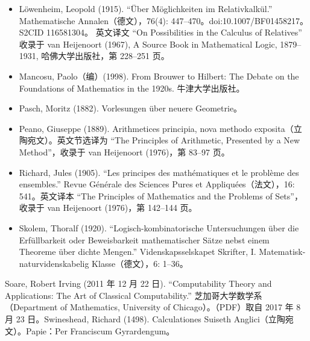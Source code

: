 \begin{itemize}
  \item Löwenheim, Leopold (1915). “Über Möglichkeiten im Relativkalkül.” Mathematische Annalen（德文），76(4): 447–470。doi:10.1007/BF01458217。S2CID 116581304。  
        英文译文 “On Possibilities in the Calculus of Relatives” 收录于 van Heijenoort (1967), A Source Book in Mathematical Logic, 1879–1931, 哈佛大学出版社，第 228–251 页。
  \item Mancosu, Paolo（编）(1998). From Brouwer to Hilbert: The Debate on the Foundations of Mathematics in the 1920s. 牛津大学出版社。
  \item Pasch, Moritz (1882). Vorlesungen über neuere Geometrie。
  \item Peano, Giuseppe (1889). Arithmetices principia, nova methodo exposita（立陶宛文）。英文节选译为 “The Principles of Arithmetic, Presented by a New Method”，收录于 van Heijenoort (1976)，第 83–97 页。
  \item Richard, Jules (1905). “Les principes des mathématiques et le problème des ensembles.” Revue Générale des Sciences Pures et Appliquées（法文），16: 541。英文译本 “The Principles of Mathematics and the Problems of Sets”，收录于 van Heijenoort (1976)，第 142–144 页。
  \item Skolem, Thoralf (1920). “Logisch-kombinatorische Untersuchungen über die Erfüllbarkeit oder Beweisbarkeit mathematischer Sätze nebst einem Theoreme über dichte Mengen.” Videnskapsselskapet Skrifter, I. Matematisk-naturvidenskabelig Klasse（德文），6: 1–36。
\end{itemize}
 Soare, Robert Irving (2011 年 12 月 22 日). “Computability Theory and Applications: The Art of Classical Computability.” 芝加哥大学数学系（Department of Mathematics, University of Chicago）。（PDF）取自 2017 年 8 月 23 日。Swineshead, Richard (1498). Calculationes Suiseth Anglici（立陶宛文）。Papie：Per Franciscum Gyrardengum。
